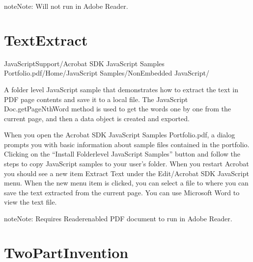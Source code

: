 \documentclass[letterpaper,12pt,english,openany,oneside]{sphinxmanual}
\begin{document}
\begin{sphinxadmonition}{note}{Note:}
Will not run in Adobe Reader.
\end{sphinxadmonition}


\section{TextExtract}
\label{\detokenize{Samples_JavaScript:textextract}}\label{\detokenize{Samples_JavaScript:location-19}}

JavaScriptSupport/Acrobat SDK JavaScript Samples Portfolio.pdf/Home/JavaScript Samples/Non\sphinxhyphen{}Embedded JavaScript/

\label{\detokenize{Samples_JavaScript:description-19}}

A folder level JavaScript sample that demonstrates how to extract the text in PDF page contents and save it to a local file. The JavaScript Doc.getPageNthWord method is used to get the words one by one from the current page, and then a data object is created and exported.

\label{\detokenize{Samples_JavaScript:usage-8}}

When you open the Acrobat SDK JavaScript Samples Portfolio.pdf, a dialog prompts you with basic information about sample files contained in the portfolio. Clicking on the “Install Folder\sphinxhyphen{}level JavaScript Samples” button and follow the steps to copy JavaScript samples to your user’s  folder. When you restart Acrobat you should see a new item Extract Text under the Edit/Acrobat SDK JavaScript menu. When the new menu item is clicked, you can select a file to where you can save the text extracted from the current page. You can use Microsoft Word to view the text file.

\begin{sphinxadmonition}{note}{Note:}
Requires Reader\sphinxhyphen{}enabled PDF document to run in Adobe Reader.
\end{sphinxadmonition}


\section{TwoPartInvention}
\label{\detokenize{Samples_JavaScript:twopartinvention}}\label{\detokenize{Samples_JavaScript:location-20}}
\end{document}
